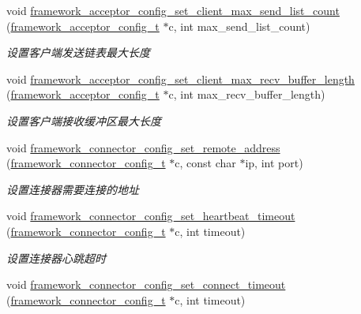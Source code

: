 \begin{DoxyCompactItemize}
void \hyperlink{a00054_a7c7289f2fdf2a2e220ceec22b5532909_a7c7289f2fdf2a2e220ceec22b5532909}{framework\+\_\+acceptor\+\_\+config\+\_\+set\+\_\+client\+\_\+max\+\_\+send\+\_\+list\+\_\+count} (\hyperlink{a00050_a61a4e424ff4c86631423dedd97c40064_a61a4e424ff4c86631423dedd97c40064}{framework\+\_\+acceptor\+\_\+config\+\_\+t} $\ast$c, int max\+\_\+send\+\_\+list\+\_\+count)
\begin{DoxyCompactList}\small\item\em 设置客户端发送链表最大长度 \end{DoxyCompactList}\item 
void \hyperlink{a00054_a7d46d7c6ac5a9871251b5efab34d767b_a7d46d7c6ac5a9871251b5efab34d767b}{framework\+\_\+acceptor\+\_\+config\+\_\+set\+\_\+client\+\_\+max\+\_\+recv\+\_\+buffer\+\_\+length} (\hyperlink{a00050_a61a4e424ff4c86631423dedd97c40064_a61a4e424ff4c86631423dedd97c40064}{framework\+\_\+acceptor\+\_\+config\+\_\+t} $\ast$c, int max\+\_\+recv\+\_\+buffer\+\_\+length)
\begin{DoxyCompactList}\small\item\em 设置客户端接收缓冲区最大长度 \end{DoxyCompactList}\item 
void \hyperlink{a00054_a3d5c40af2faafd53f9ead5cb2ff8c0b0_a3d5c40af2faafd53f9ead5cb2ff8c0b0}{framework\+\_\+connector\+\_\+config\+\_\+set\+\_\+remote\+\_\+address} (\hyperlink{a00050_a81253f4c995b97e69be0e67f7a26097f_a81253f4c995b97e69be0e67f7a26097f}{framework\+\_\+connector\+\_\+config\+\_\+t} $\ast$c, const char $\ast$ip, int port)
\begin{DoxyCompactList}\small\item\em 设置连接器需要连接的地址 \end{DoxyCompactList}\item 
void \hyperlink{a00054_a15e1d8ef32fcc99dcc9c35383fa5dbc8_a15e1d8ef32fcc99dcc9c35383fa5dbc8}{framework\+\_\+connector\+\_\+config\+\_\+set\+\_\+heartbeat\+\_\+timeout} (\hyperlink{a00050_a81253f4c995b97e69be0e67f7a26097f_a81253f4c995b97e69be0e67f7a26097f}{framework\+\_\+connector\+\_\+config\+\_\+t} $\ast$c, int timeout)
\begin{DoxyCompactList}\small\item\em 设置连接器心跳超时 \end{DoxyCompactList}\item 
void \hyperlink{a00054_a59a35df5173a2f94e5b743fbeeb48f6b_a59a35df5173a2f94e5b743fbeeb48f6b}{framework\+\_\+connector\+\_\+config\+\_\+set\+\_\+connect\+\_\+timeout} (\hyperlink{a00050_a81253f4c995b97e69be0e67f7a26097f_a81253f4c995b97e69be0e67f7a26097f}{framework\+\_\+connector\+\_\+config\+\_\+t} $\ast$c, int timeout)

\end{DoxyCompactItemize}
